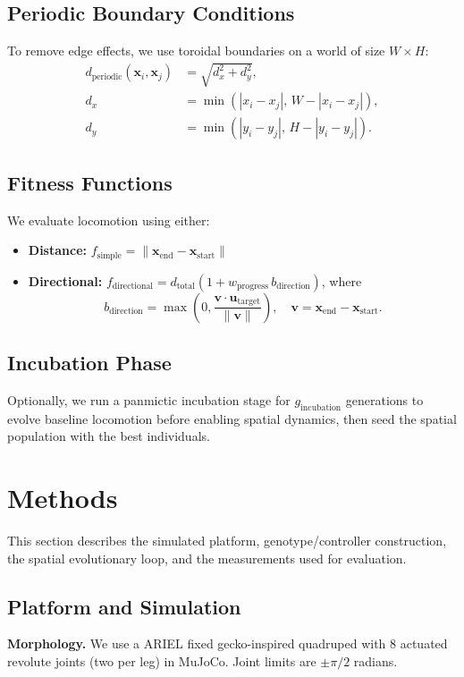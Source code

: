 \documentclass[dvipsnames,format=sigconf,anonymous=false,review=false]{acmart}
\begin{document}
\subsection{Periodic Boundary Conditions}
\label{sec:periodic}
To remove edge effects, we use toroidal boundaries on a world of size $W\times H$:
\begin{align}
d_{\text{periodic}}(\mathbf{x}_i,\mathbf{x}_j) &= \sqrt{d_x^2+d_y^2},\\
d_x &= \min(|x_i-x_j|,\, W-|x_i-x_j|),\\
d_y &= \min(|y_i-y_j|,\, H-|y_i-y_j|).
\end{align}

\subsection{Fitness Functions}
\label{sec:fitness}
We evaluate locomotion using either:
\begin{itemize}
  \item \textbf{Distance:}\;\;
  $f_{\text{simple}}=\|\mathbf{x}_{\text{end}}-\mathbf{x}_{\text{start}}\|$
  \item \textbf{Directional:}\;\;
  $f_{\text{directional}}=d_{\text{total}}\left(1+w_{\text{progress}}\,b_{\text{direction}}\right)$, where
  \begin{equation}
  b_{\text{direction}}=\max\!\left(0,\frac{\mathbf{v}\cdot\mathbf{u}_{\text{target}}}{\|\mathbf{v}\|}\right),\quad
  \mathbf{v}=\mathbf{x}_{\text{end}}-\mathbf{x}_{\text{start}}.
  \end{equation}
\end{itemize}

\subsection{Incubation Phase}
Optionally, we run a panmictic incubation stage for $g_{\text{incubation}}$ generations to evolve baseline locomotion before enabling spatial dynamics, then seed the spatial population with the best individuals.



\section{Methods}
This section describes the simulated platform, genotype/controller construction, the spatial evolutionary loop, and the measurements used for evaluation.

\subsection{Platform and Simulation}
\textbf{Morphology.} We use a ARIEL fixed gecko-inspired quadruped with $8$ actuated revolute joints (two per leg) in MuJoCo. Joint limits are $\pm \pi/2$ radians.
\end{document}
